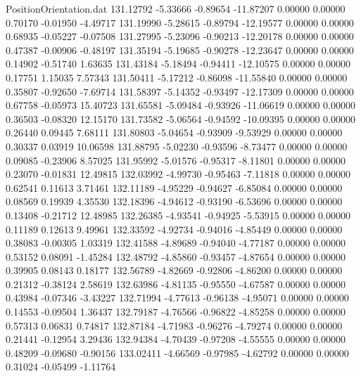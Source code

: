 \begin{filecontents}{PositionOrientation.dat}
 131.12792   -5.33666   -0.89654   -11.87207    0.00000    0.00000    0.70170   -0.01950   -4.49717
 131.19990   -5.28615   -0.89794   -12.19577    0.00000    0.00000    0.68935   -0.05227   -0.07508
 131.27995   -5.23096   -0.90213   -12.20178    0.00000    0.00000    0.47387   -0.00906   -0.48197
 131.35194   -5.19685   -0.90278   -12.23647    0.00000    0.00000    0.14902   -0.51740    1.63635
 131.43184   -5.18494   -0.94411   -12.10575    0.00000    0.00000    0.17751    1.15035    7.57343
 131.50411   -5.17212   -0.86098   -11.55840    0.00000    0.00000    0.35807   -0.92650   -7.69714
 131.58397   -5.14352   -0.93497   -12.17309    0.00000    0.00000    0.67758   -0.05973   15.40723
 131.65581   -5.09484   -0.93926   -11.06619    0.00000    0.00000    0.36503   -0.08320   12.15170
 131.73582   -5.06564   -0.94592   -10.09395    0.00000    0.00000    0.26440    0.09445    7.68111
 131.80803   -5.04654   -0.93909    -9.53929    0.00000    0.00000    0.30337    0.03919   10.06598
 131.88795   -5.02230   -0.93596    -8.73477    0.00000    0.00000    0.09085   -0.23906    8.57025
 131.95992   -5.01576   -0.95317    -8.11801    0.00000    0.00000    0.23070   -0.01831   12.49815
 132.03992   -4.99730   -0.95463    -7.11818    0.00000    0.00000    0.62541    0.11613    3.71461
 132.11189   -4.95229   -0.94627    -6.85084    0.00000    0.00000    0.08569    0.19939    4.35530
 132.18396   -4.94612   -0.93190    -6.53696    0.00000    0.00000    0.13408   -0.21712   12.48985
 132.26385   -4.93541   -0.94925    -5.53915    0.00000    0.00000    0.11189    0.12613    9.49961
 132.33592   -4.92734   -0.94016    -4.85449    0.00000    0.00000    0.38083   -0.00305    1.03319
 132.41588   -4.89689   -0.94040    -4.77187    0.00000    0.00000    0.53152    0.08091   -1.45284
 132.48792   -4.85860   -0.93457    -4.87654    0.00000    0.00000    0.39905    0.08143    0.18177
 132.56789   -4.82669   -0.92806    -4.86200    0.00000    0.00000    0.21312   -0.38124    2.58619
 132.63986   -4.81135   -0.95550    -4.67587    0.00000    0.00000    0.43984   -0.07346   -3.43227
 132.71994   -4.77613   -0.96138    -4.95071    0.00000    0.00000    0.14553   -0.09504    1.36437
 132.79187   -4.76566   -0.96822    -4.85258    0.00000    0.00000    0.57313    0.06831    0.74817
 132.87184   -4.71983   -0.96276    -4.79274    0.00000    0.00000    0.21441   -0.12954    3.29436
 132.94384   -4.70439   -0.97208    -4.55555    0.00000    0.00000    0.48209   -0.09680   -0.90156
 133.02411   -4.66569   -0.97985    -4.62792    0.00000    0.00000    0.31024   -0.05499   -1.11764

\end{filecontents}
